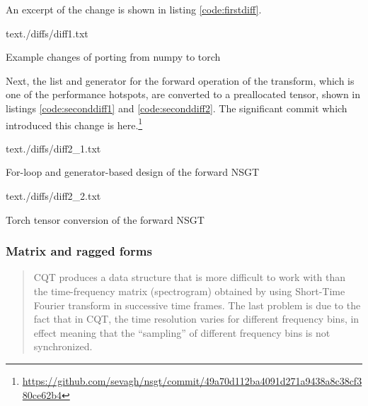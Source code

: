 \documentclass[report.tex]{subfiles}
\begin{document}
An excerpt of the change is shown in listing \ref{code:firstdiff}. 

\begin{listing}[ht]
  \centering
\begin{inputminted}[linenos,breaklines,frame=single]{text}{./diffs/diff1.txt}
\end{inputminted}
  \caption{Example changes of porting from numpy to torch}
  \label{code:firstdiff}
\end{listing}

Next, the list and generator for the forward operation of the transform, which is one of the performance hotspots, are converted to a preallocated tensor, shown in listings \ref{code:seconddiff1} and \ref{code:seconddiff2}. The significant commit which introduced this change is here.\footnote{\url{https://github.com/sevagh/nsgt/commit/49a70d112ba4091d271a9438a8c38cf380ce62b4}}

\begin{listing}[ht]
  \centering
\begin{inputminted}[linenos,breaklines,frame=single]{text}{./diffs/diff2_1.txt}
\end{inputminted}
  \caption{For-loop and generator-based design of the forward NSGT}
  \label{code:seconddiff1}
\end{listing}

\begin{listing}[ht]
  \centering
\begin{inputminted}[linenos,breaklines,frame=single]{text}{./diffs/diff2_2.txt}
\end{inputminted}
  \caption{Torch tensor conversion of the forward NSGT}
  \label{code:seconddiff2}
\end{listing}

\newpagefill

\subsubsection{Matrix and ragged forms}

\textcite{klapuricqt}
\begin{quote}
	CQT produces a data structure that is more difficult to work with than the time-frequency matrix (spectrogram) obtained by using Short-Time Fourier transform in successive time frames. The last problem is due to the fact that in CQT, the time resolution varies for different frequency bins, in effect meaning that the ``sampling'' of different frequency bins is not synchronized.
\end{quote}
\end{document}
